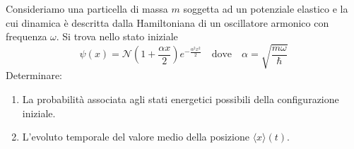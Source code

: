 Consideriamo una particella di massa $m$ soggetta ad un potenziale elastico e la cui dinamica \`e descritta dalla Hamiltoniana di un oscillatore armonico con frequenza $\omega$. Si trova nello stato iniziale
\begin{equation*}
	\psi(x) = \mathcal{N} \left( 1 + \frac{\alpha x}{2}\right)e^{-\frac{\alpha^2 x^2}{2}} \quad \text{dove} \quad \alpha = \sqrt{\frac{m \omega}{\hbar}} 
\end{equation*}
Determinare:
\begin{enumerate}
	\item La probabilit\`a associata agli stati energetici possibili della configurazione iniziale.
	\item L'evoluto temporale del valore medio della posizione $\langle x \rangle (t)$.
\end{enumerate}

